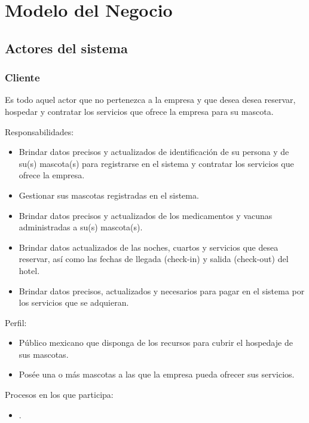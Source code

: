 
\chapter{Modelo del Negocio}	
\label{cap:reqSist}


\section{Actores del sistema}

	
	\begin{Usuario}{\hypertarget{Cliente}{\subsection{Cliente}}}{
			Es todo aquel actor que no pertenezca a la empresa y que desea desea reservar, hospedar y contratar los servicios que ofrece la empresa para su mascota.
		}
		\item[Responsabilidades:] \cdtEmpty
		\begin{itemize}
			\item Brindar datos precisos y actualizados de identificación de su persona y de su(s) mascota(s) para registrarse en el sistema y contratar los servicios que ofrece la empresa.
			\item Gestionar sus mascotas registradas en el sistema.
			\item Brindar datos precisos y actualizados de los medicamentos y vacunas administradas a su(s) mascota(s).
			\item Brindar datos actualizados de las noches, cuartos y servicios que desea reservar, así como las fechas de llegada (check-in) y salida (check-out) del hotel.
			\item Brindar datos precisos, actualizados y necesarios para pagar en el sistema por los servicios que se adquieran.
		\end{itemize}
		
		\item[Perfil:] \cdtEmpty
		\begin{itemize}
			\item Público mexicano que disponga de los recursos para cubrir el hospedaje de sus mascotas.
			\item Posée una o más mascotas a las que la empresa pueda ofrecer sus servicios.
		\end{itemize}
		\item[Procesos en los que participa:] \cdtEmpty
		\begin{itemize}
			\item .
		\end{itemize}
	\end{Usuario}

